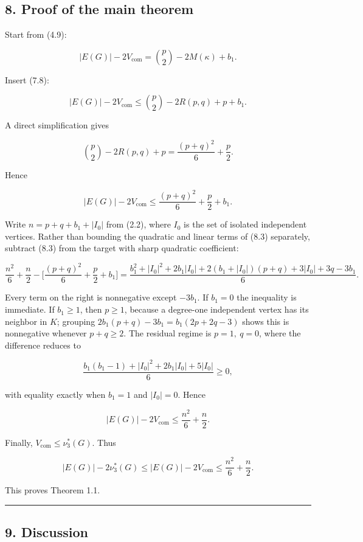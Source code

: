 \documentclass[
  american,
  11pt,
  a4paper,
]{article}
\begin{document}
\subsection{8. Proof of the main theorem}\label{proof-of-the-main-theorem}

Start from (4.9):

\[
|E(G)|-2V_{\mathrm{com}}
=
\binom p2-2M(\kappa)+b_1.
\]

Insert (7.8):

\[
|E(G)|-2V_{\mathrm{com}}
\le
\binom p2-2R(p,q)+p+b_1.
\tag{8.1}
\]

A direct simplification gives

\[
\binom p2-2R(p,q)+p
=
\frac{(p+q)^2}{6}+\frac p2.
\tag{8.2}
\]

Hence

\[
|E(G)|-2V_{\mathrm{com}}
\le
\frac{(p+q)^2}{6}+\frac p2+b_1.
\tag{8.3}
\]

Write \(n=p+q+b_1+|I_0|\) from (2.2), where \(I_0\) is the set of isolated independent vertices. Rather than bounding the quadratic and linear terms of (8.3) separately, subtract (8.3) from the target with sharp quadratic coefficient:

\[
\frac{n^2}{6}+\frac n2-\Big[\frac{(p+q)^2}{6}+\frac p2+b_1\Big]
=
\frac{b_1^2+|I_0|^2+2b_1|I_0|+2(b_1+|I_0|)(p+q)+3|I_0|+3q-3b_1}{6}.
\]

Every term on the right is nonnegative except \(-3b_1\). If \(b_1=0\) the inequality is immediate. If \(b_1\ge1\), then \(p\ge1\), because a degree-one independent vertex has its neighbor in \(K\); grouping \(2b_1(p+q)-3b_1=b_1(2p+2q-3)\) shows this is nonnegative whenever \(p+q\ge2\). The residual regime is \(p=1,\ q=0\), where the difference reduces to

\[
\frac{b_1(b_1-1)+|I_0|^2+2b_1|I_0|+5|I_0|}{6}\ge0,
\]

with equality exactly when \(b_1=1\) and \(|I_0|=0\). Hence

\[
|E(G)|-2V_{\mathrm{com}}
\le
\frac{n^2}{6}+\frac n2.
\tag{8.4}
\]

Finally, \(V_{\mathrm{com}}\le\nu_3^*(G)\). Thus

\[
|E(G)|-2\nu_3^*(G)
\le
|E(G)|-2V_{\mathrm{com}}
\le
\frac{n^2}{6}+\frac n2.
\]

This proves Theorem 1.1.

\begin{center}\rule{0.5\linewidth}{0.5pt}\end{center}

\subsection{9. Discussion}\label{discussion}
\end{document}
